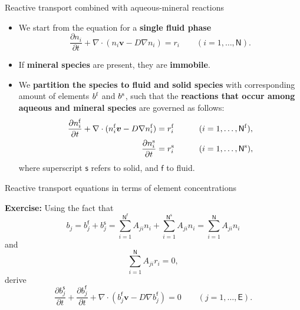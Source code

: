 \begin{frame}[<+->]{Reactive transport combined with aqueous-mineral reactions}
\begin{itemize}
\item We start from the equation for a \alert{\bf single fluid phase}
\[
\frac{\partial n_{i}}{\partial t}+\nabla\cdot(n_{i}\boldsymbol{v}-D\nabla n_{i})=r_{i}\qquad(i=1,\ldots,\mathsf{N}).
\]
\item If \alert{\bf mineral species} are present, they are \alert{\bf immobile}. 
\item We \alert{\bf partition the species to fluid and solid species} with corresponding amount of elements $b^{\rm f}$ and $b^{\rm s}$, such that the {\bf reactions that occur among
aqueous and mineral species} are governed as follows:
%
\begin{alignat*}{2}
\frac{\partial n^{\rm f}_{i}}{\partial t}+\nabla\cdot(n^{\rm f}_{i}\boldsymbol{v}-D\nabla n^{\rm f}_{i}) & =r^{\rm f}_{i} & \qquad & (i=1,\ldots,\mathsf{N^{\rm f}}),\\
\frac{\partial n^{\rm s}_{i}}{\partial t} & =r^{\rm s}_{i} &  & (i=1,\ldots,\mathsf{N^{\rm s}}),
\end{alignat*}
%
where superscript $\mathsf{s}$ refers to solid, and $\mathsf{f}$
to fluid.
\end{itemize}
\end{frame}
%
\begin{frame}{Reactive transport equations in terms of element concentrations}

\alert{\textbf{Exercise:}} Using the fact that
\[
b_{j}=b_{j}^{\mathsf{f}}+b_{j}^{\mathsf{s}}=\sum_{i=1}^{\mathsf{N^{f}}}A_{ji}n_{i}+\sum_{i=1}^{\mathsf{N^{s}}}A_{ji}n_{i}=\sum_{i=1}^{\mathsf{N}}A_{ji}n_{i}
\]
and
\[
\sum_{i=1}^{\mathsf{N}}A_{ji}r_{i}=0,
\]
%
derive
\[
\frac{\partial b_{j}^{\mathsf{s}}}{\partial t}+\frac{\partial b_{j}^{\mathsf{f}}}{\partial t}+\nabla\cdot(b_{j}^{\mathsf{f}}\boldsymbol{v}-D\nabla b_{j}^{\mathsf{f}})=0\qquad(j=1,\ldots,\mathsf{E}).
\]

\end{frame}
%
%
